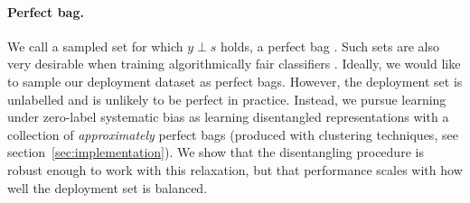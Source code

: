 \paragraph{Perfect bag.}
We call a sampled set for which $y\perp s$ holds, a perfect bag \citep{chouldechova2017fair,kleinberg2016inherent}.
Such sets are also very desirable when training algorithmically fair classifiers
\citep[see the \emph{sampling} method in][]{kamiran2012data}.
%
%
Ideally, we would like to sample our deployment dataset as perfect bags.
However, the deployment set is unlabelled and is unlikely to be perfect in practice. 
Instead, we pursue learning under zero-label systematic bias as learning disentangled representations with a collection of \emph{approximately} perfect bags (produced with clustering techniques, see section~\ref{sec:implementation}).
We show that the disentangling procedure is robust enough to work with this relaxation, but that performance scales with how well the deployment set is balanced.

